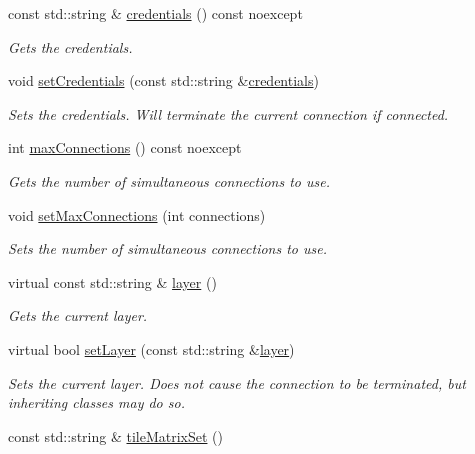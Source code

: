 \begin{DoxyCompactItemize}
const std\+::string \& \hyperlink{group___imagery_module_gac4c03ea635c336ca2fe7de533706c11c}{credentials} () const noexcept
\begin{DoxyCompactList}\small\item\em Gets the credentials. \end{DoxyCompactList}\item 
void \hyperlink{group___imagery_module_ga28ed4b8b833fa7785b0c456f79df0c40}{set\+Credentials} (const std\+::string \&\hyperlink{group___imagery_module_gac4c03ea635c336ca2fe7de533706c11c}{credentials})
\begin{DoxyCompactList}\small\item\em Sets the credentials. Will terminate the current connection if connected. \end{DoxyCompactList}\item 
int \hyperlink{group___imagery_module_ga772f97c22e6540f665946757800b2ed7}{max\+Connections} () const noexcept
\begin{DoxyCompactList}\small\item\em Gets the number of simultaneous connections to use. \end{DoxyCompactList}\item 
void \hyperlink{group___imagery_module_ga8584ffb2dd25fce0f67842b72defb0cf}{set\+Max\+Connections} (int connections)
\begin{DoxyCompactList}\small\item\em Sets the number of simultaneous connections to use. \end{DoxyCompactList}\item 
virtual const std\+::string \& \hyperlink{group___imagery_module_gafe3e2d18fb0c9ef72b3c23e97ead241f}{layer} ()
\begin{DoxyCompactList}\small\item\em Gets the current layer. \end{DoxyCompactList}\item 
virtual bool \hyperlink{group___imagery_module_ga509f0f787565fafc1618cc0e5fb2399a}{set\+Layer} (const std\+::string \&\hyperlink{group___imagery_module_gafe3e2d18fb0c9ef72b3c23e97ead241f}{layer})
\begin{DoxyCompactList}\small\item\em Sets the current layer. Does not cause the connection to be terminated, but inheriting classes may do so. \end{DoxyCompactList}\item 
const std\+::string \& \hyperlink{group___imagery_module_gae380a970bc0aa63d34e6f2295ea9c8f4}{tile\+Matrix\+Set} ()

\end{DoxyCompactItemize}
